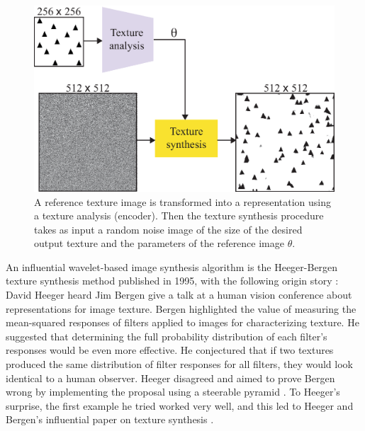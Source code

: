 {\begin{figure}
\centerline{
\includegraphics[width=.8\linewidth]{figures/heeger_bergen/analysis_heeger_bergen.eps}
}
\caption{A reference texture image is transformed into a representation using a texture analysis (encoder). Then the texture synthesis procedure takes as input  a random noise image of the size of the desired output texture and the parameters of the reference image $\theta$.
}
\label{fig:analysis_heeger_bergen}
\end{figure}




An influential wavelet-based image synthesis algorithm is the Heeger-Bergen texture 
synthesis method published in 1995, with the following origin story \cite{Heeger95Personal}:  David Heeger heard Jim Bergen give a talk at a human vision conference about representations for image texture. 
Bergen highlighted the value of measuring the mean-squared responses of filters applied to images for characterizing texture. He suggested that determining the full probability distribution of each filter's responses would be even more effective. He conjectured that if two textures produced the same distribution of filter responses for all filters, they would look identical to a human observer. Heeger disagreed and aimed to prove Bergen wrong by implementing the proposal using a steerable pyramid \cite{Simoncelli95}.  To Heeger's surprise, the first example he tried worked very well, and this led to Heeger and Bergen's influential paper on texture synthesis \cite{RG:Heeger-Bergen95}.




}
